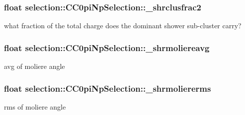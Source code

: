 \subsubsection[{\texorpdfstring{\+\_\+shrclusfrac2}{_shrclusfrac2}}]{\setlength{\rightskip}{0pt plus 5cm}float selection\+::\+C\+C0pi\+Np\+Selection\+::\+\_\+shrclusfrac2\hspace{0.3cm}{\ttfamily [private]}}\hypertarget{classselection_1_1CC0piNpSelection_acf870c688a80fa995ed5c6245fa02608}{}\label{classselection_1_1CC0piNpSelection_acf870c688a80fa995ed5c6245fa02608}
what fraction of the total charge does the dominant shower sub-\/cluster carry? 
\subsubsection[{\texorpdfstring{\+\_\+shrmoliereavg}{_shrmoliereavg}}]{\setlength{\rightskip}{0pt plus 5cm}float selection\+::\+C\+C0pi\+Np\+Selection\+::\+\_\+shrmoliereavg\hspace{0.3cm}{\ttfamily [private]}}\hypertarget{classselection_1_1CC0piNpSelection_a12991c5dfa675422d48f75a1caeae3ea}{}\label{classselection_1_1CC0piNpSelection_a12991c5dfa675422d48f75a1caeae3ea}
avg of moliere angle 
\subsubsection[{\texorpdfstring{\+\_\+shrmoliererms}{_shrmoliererms}}]{\setlength{\rightskip}{0pt plus 5cm}float selection\+::\+C\+C0pi\+Np\+Selection\+::\+\_\+shrmoliererms\hspace{0.3cm}{\ttfamily [private]}}\hypertarget{classselection_1_1CC0piNpSelection_a4fbd21a7fae1f01027cfe234e925c19a}{}\label{classselection_1_1CC0piNpSelection_a4fbd21a7fae1f01027cfe234e925c19a}
rms of moliere angle 

